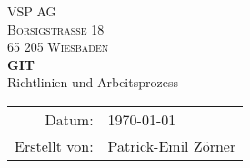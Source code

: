 \documentclass[12pt,oneside,a4paper]{article}
\begin{document}
\begin{titlepage}
  \begin{center}
    {\textsc{VSP AG\\
        Borsigstraße 18\\
        65 205 Wiesbaden\\}}
    \vspace{25mm}
    {\Huge\textbf{GIT}}\\
    \vspace{1cm}
    {\LARGE Richtlinien und Arbeitsprozess}\\[1.4ex]
    \vspace{10cm}
    \begin{tabular}{rl}
      Datum:&\quad \today \\
      Erstellt von:&\quad Patrick-Emil Zörner\\
    \end{tabular}
  \end{center}
\end{titlepage}
\tableofcontents
\newpage
{}
\listoffigures
\newpage
{}


\end{document}
